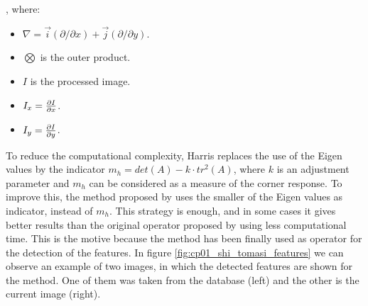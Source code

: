 , where:

\begin{itemize}
 \item $\nabla = \vec{i} (\partial / \partial x) + \vec{j} (\partial / \partial y)$.
 \item $\bigotimes$ is the outer product.
 \item $I$ is the processed image.
 \item $I_x = {{\partial I} \over {\partial x}}$.
 \item $I_y = {{\partial I} \over {\partial y}}$.
\end{itemize}

To reduce the computational complexity, Harris replaces the use of the Eigen values by the indicator $m_h = det(A) − k \cdot tr^2(A)$, where $k$ is an adjustment parameter and $m_h$ can be considered as a measure of the corner response. To improve this, the method proposed by \cite{shi1994good} uses the smaller of the Eigen values as indicator, instead of $m_h$. This strategy is enough, and in some cases it gives better results than the original operator proposed by \cite{harris1988combined} using less computational time. This is the motive because the \cite{shi1994good} method has been finally used as operator for the detection of the features. In figure \ref{fig:cp01_shi_tomasi_features} we can observe an example of two images, in which the detected features are shown for the \cite{shi1994good} method. One of them was taken from the database (left) and the other is the current image (right).


